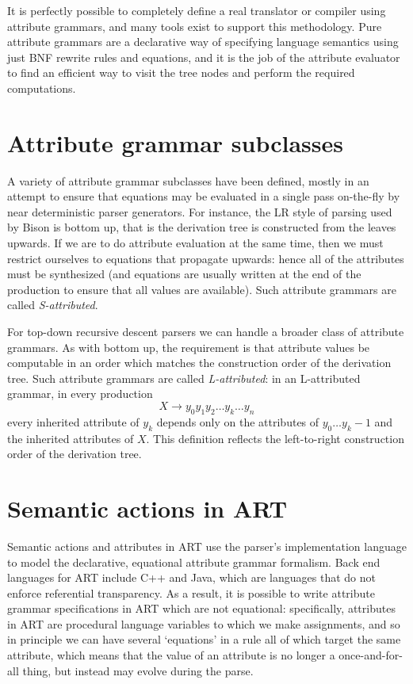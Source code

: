 It is perfectly possible to completely define a real translator or compiler using attribute grammars, and many tools exist to support this methodology. Pure attribute grammars are a declarative way of specifying language semantics using just BNF rewrite rules and equations, and it is the job of the attribute evaluator to find an efficient way to visit the tree nodes and perform the required computations.

\section{Attribute grammar subclasses}
A variety of attribute grammar subclasses have been defined, mostly in an attempt to ensure that equations may be evaluated in a single pass on-the-fly by near deterministic parser generators. For instance, the LR style of parsing used by Bison is bottom up, that is the derivation tree is constructed from the leaves upwards. If we are to do attribute evaluation at the same time, then we must restrict ourselves to equations that propagate upwards: hence all of the attributes must be synthesized (and equations are usually written at the end of the production to ensure that all values are available). Such attribute grammars are called {\em S-attributed}.

For top-down recursive descent parsers we can handle a broader class of attribute grammars. As with bottom up, the requirement is that attribute values be computable in an order which matches the construction order of the derivation tree. Such attribute grammars are called {\em L-attributed}:
in an L-attributed grammar, in every production
\[
X \rightarrow y_0 y_1 y_2 \ldots y_k \ldots y_n
\]
every inherited attribute of $y_k$ depends only on the attributes of $y_0\ldots y_k-1$ and the inherited attributes of $X$. This definition reflects the left-to-right construction order of the derivation tree.

\section{Semantic actions in ART}
Semantic actions and attributes in ART use the parser's implementation
language to model the declarative, equational attribute grammar
formalism. Back end languages for ART include C++ and Java, which are
languages that do not enforce referential transparency. As a result,
it is possible to write attribute grammar specifications in ART which
are not equational: specifically, attributes in ART are procedural
language variables to which we make assignments, and so in principle
we can have several `equations' in a rule all of which target the same
attribute, which means that the value of an attribute is no longer a
once-and-for-all thing, but instead may evolve during the parse.

